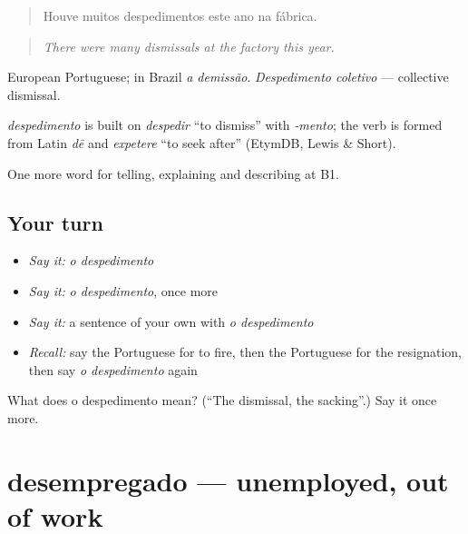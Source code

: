 \begin{quote}
Houve muitos despedimentos este ano na fábrica.
\end{quote}

\begin{quote}
\emph{There were many dismissals at the factory this year.}
\end{quote}

European Portuguese; in Brazil \emph{a demissão}. \emph{Despedimento coletivo} — collective dismissal.

\begin{cousinweb}
\emph{despedimento} is built on \emph{despedir} \textquotedblleft{}to dismiss\textquotedblright{} with \emph{-mento}; the verb is formed from Latin \emph{dē} and \emph{expetere} \textquotedblleft{}to seek after\textquotedblright{} (EtymDB, Lewis \& Short).
\end{cousinweb}

\begin{grammarlens}[title={What you've built}]
One more word for telling, explaining and describing at B1.
\end{grammarlens}

\subsection*{Your turn}
\begin{itemize}
\raggedright
  \item \emph{Say it:} \emph{o despedimento}
  \item \emph{Say it:} \emph{o despedimento}, once more
  \item \emph{Say it:} a sentence of your own with \emph{o despedimento}
  \item \emph{Recall:} say the Portuguese for to fire, then the Portuguese for the resignation, then say \emph{o despedimento} again
\end{itemize}

\begin{tcolorbox}[breakable,colback=teal!4,colframe=teal!35!black,title={Before you move on}]
What does o despedimento mean? (\textquotedblleft{}The dismissal, the sacking\textquotedblright{}.) Say it once more.
\end{tcolorbox}
\section[desempregado]{desempregado — unemployed, out of work}

\label{lesson:PT-C356-desempregado}



